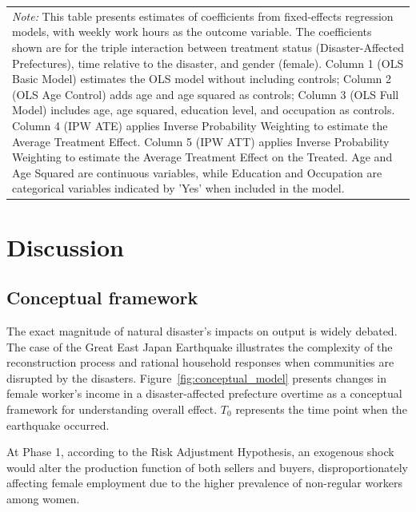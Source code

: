 \documentclass[a4paper,12pt]{article}
\begin{document}
\begin{table}[htbp]
{\begin{tabular}{@{\extracolsep{5pt}}lccccc}
\multicolumn{6}{p{1.50\linewidth}}{\footnotesize \textit{Note:} This table presents estimates of coefficients from fixed-effects regression models, with weekly work hours as the outcome variable. The coefficients shown are for the triple interaction between treatment status (Disaster-Affected Prefectures), time relative to the disaster, and gender (female). Column 1 (OLS Basic Model) estimates the OLS model without including controls; Column 2 (OLS Age Control) adds age and age squared as controls; Column 3 (OLS Full Model) includes age, age squared, education level, and occupation as controls. Column 4 (IPW ATE) applies Inverse Probability Weighting to estimate the Average Treatment Effect. Column 5 (IPW ATT) applies Inverse Probability Weighting to estimate the Average Treatment Effect on the Treated. Age and Age Squared are continuous variables, while Education and Occupation are categorical variables indicated by 'Yes' when included in the model.}\\
\end{tabular}
}

\label{table:weekly_work_hours}


\end{table}


\section{Discussion}
\label{sec5}

\subsection{Conceptual framework}
\label{sec5.1}

The exact magnitude of natural disaster's impacts on output is widely debated. The case of the Great East Japan Earthquake illustrates the complexity of the reconstruction process and rational household responses when communities are disrupted by the disasters. Figure~\ref{fig:conceptual_model} presents changes in female worker's income in a disaster-affected prefecture overtime as a conceptual framework for understanding overall effect. $T_{0}$ represents the time point when the earthquake occurred. 

At Phase 1, according to the Risk Adjustment Hypothesis, an exogenous shock would alter the production function of both sellers and buyers, disproportionately affecting female employment due to the higher prevalence of non-regular workers among women.
\end{document}
